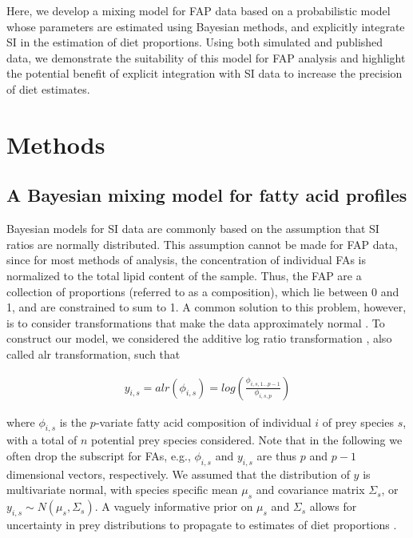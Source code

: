 \documentclass{article}%
\begin{document}
\begin{spacing}{1.9}
\begin{flushleft}
Here, we develop a mixing model for FAP data based on a probabilistic
model whose parameters are estimated using Bayesian methods, and
explicitly integrate SI in the estimation of diet proportions. Using both simulated and
published data, we demonstrate the suitability of this model for FAP analysis and
highlight the potential benefit of explicit integration with SI data
to increase the precision of diet estimates.
 
\section{Methods}
\subsection{A Bayesian mixing model for fatty acid profiles}

Bayesian models for SI data are commonly based on the assumption that
SI ratios are normally distributed. This assumption cannot be made for
FAP data, since for most methods of analysis, the concentration of
individual FAs is normalized to the total lipid content of the
sample. Thus, the FAP are a collection of proportions (referred to as
a composition), which lie between 0 and 1, and are constrained to sum
to 1. A common solution to this problem, however, is to consider
transformations that make the data approximately normal
\citep{budge_studying_2006}. To construct our model, we considered the
additive log ratio transformation \citep{aitchison_convex_1999},
also called alr transformation, such that

\begin{align}
y_{i,s} = alr(\phi_{i,s}) = log \left( \frac{\phi_{i,s,1...p-1}}{\phi_{i,s,p}} \right)
\end{align}

where $\phi_{i,s}$ is the $p$-variate fatty acid composition of individual
$i$ of prey species $s$, with a total of $n$ potential prey species
considered. Note that in the following we often drop the subscript for
FAs, e.g., $\phi_{i,s}$ and $y_{i,s}$ are thus $p$ and $p-1$
dimensional vectors, respectively. We assumed that the distribution of $y$ is
multivariate normal, with species specific mean $\mu_s$ and covariance matrix $\Sigma_s$,
or $y_{i,s} \sim N(\mu_s,\Sigma_s)$. A vaguely informative prior on
$\mu_s$ and $\Sigma_s$ allows for uncertainty in prey distributions to propagate to estimates of diet proportions \citep{ward_including_2010}.


\end{flushleft}
\end{spacing}
\end{document}
